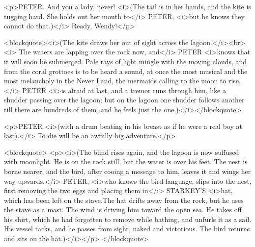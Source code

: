 <p>PETER. And you a lady, never! <i>(The tail is in her hands, and the kite is tugging hard. She holds out her mouth to</i> PETER, <i>but he knows they cannot do that.)</i> Ready, Wendy!</p>

<blockquote><i>(The kite draws her out of sight across the lagoon.</i><br> <i> The waters are lapping over the rock now, and</i> PETER <i>knows that it will soon be submerged. Pale rays of light mingle with the moving clouds, and from the coral grottoes is to be heard a sound, at once the most musical and the most melancholy in the Never Land, the mermaids calling to the moon to rise.</i> PETER <i>is afraid at last, and a tremor runs through him, like a shudder passing over the lagoon; but on the lagoon one shudder follows another till there are hundreds of them, and he feels just the one.)</i></blockquote>

<p>PETER <i>(with a drum beating in his breast as if he were a real boy at last).</i> To die will be an awfully big adventure.</p>

<blockquote> <p><i>(The blind rises again, and the lagoon is now suffused with moonlight. He is on the rock still, but the water is over his feet. The nest is borne nearer, and the bird, after cooing a message to him, leaves it and wings her way upwards.</i> PETER, <i>who knows the bird language, slips into the nest, first removing the two eggs and placing them in</i> STARKEY'S <i>hat, which has been left on the stave.The hat drifts away from the rock, but he uses the stave as a mast. The wind is driving him toward the open sea. He takes off his shirt, which he had forgotten to remove while bathing, and unfurls it as a sail. His vessel tacks, and he passes from sight, naked and victorious. The bird returns and sits on the hat.)</i></p> </blockquote>
